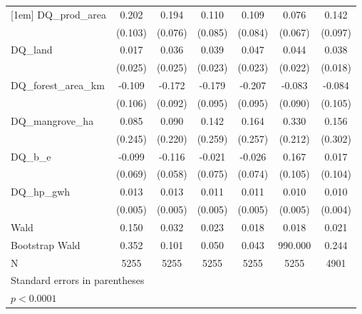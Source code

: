 \begin{table}[htbp]
\begin{tabular}{l*{6}{c}}
[1em]
DQ\_prod\_area&       0.202       &       0.194       &       0.110       &       0.109       &       0.076       &       0.142       \\
            &     (0.103)       &     (0.076)       &     (0.085)       &     (0.084)       &     (0.067)       &     (0.097)       \\
[1em]
DQ\_land     &       0.017       &       0.036       &       0.039       &       0.047       &       0.044       &       0.038       \\
            &     (0.025)       &     (0.025)       &     (0.023)       &     (0.023)       &     (0.022)       &     (0.018)       \\
[1em]
DQ\_forest\_area\_km&      -0.109       &      -0.172       &      -0.179       &      -0.207       &      -0.083       &      -0.084       \\
            &     (0.106)       &     (0.092)       &     (0.095)       &     (0.095)       &     (0.090)       &     (0.105)       \\
[1em]
DQ\_mangrove\_ha&       0.085       &       0.090       &       0.142       &       0.164       &       0.330       &       0.156       \\
            &     (0.245)       &     (0.220)       &     (0.259)       &     (0.257)       &     (0.212)       &     (0.302)       \\
[1em]
DQ\_b\_e      &      -0.099       &      -0.116       &      -0.021       &      -0.026       &       0.167       &       0.017       \\
            &     (0.069)       &     (0.058)       &     (0.075)       &     (0.074)       &     (0.105)       &     (0.104)       \\
[1em]
DQ\_hp\_gwh   &       0.013       &       0.013       &       0.011       &       0.011       &       0.010       &       0.010       \\
            &     (0.005)       &     (0.005)       &     (0.005)       &     (0.005)       &     (0.005)       &     (0.004)       \\
\hline
Wald        &       0.150       &       0.032       &       0.023       &       0.018       &       0.018       &       0.021       \\
Bootstrap Wald&       0.352       &       0.101       &       0.050       &       0.043       &     990.000       &       0.244       \\
N           &        5255       &        5255       &        5255       &        5255       &        5255       &        4901       \\
\hline\hline
\multicolumn{7}{l}{\footnotesize Standard errors in parentheses}\\
\multicolumn{7}{l}{\footnotesize \sym{*} \(p<0.0001\)}\\
\end{tabular}
\end{table}
